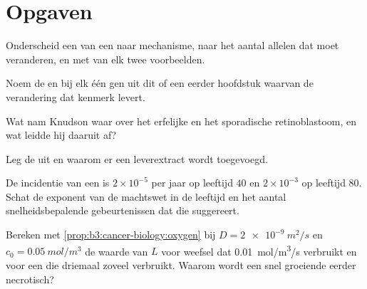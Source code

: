 \section{Opgaven}

\begin{exercise}[$\star$]\label{exo:b3:cancer-biology:1}
Onderscheid een  van een  naar mechanisme,
naar het aantal allelen dat moet veranderen, en met van elk twee
voorbeelden.
\end{exercise}

\begin{exercise}[$\star$]\label{exo:b3:cancer-biology:2}
Noem de  en bij elk één gen uit dit of een eerder
hoofdstuk waarvan de verandering dat kenmerk levert.
\end{exercise}

\begin{exercise}[$\star$]\label{exo:b3:cancer-biology:3}
Wat nam Knudson waar over het erfelijke en het sporadische
retinoblastoom, en wat leidde hij daaruit af?
\end{exercise}

\begin{exercise}[$\star$]\label{exo:b3:cancer-biology:4}
Leg de  uit en waarom er een leverextract wordt toegevoegd.
\end{exercise}

\begin{exercise}[$\star\star$]\label{exo:b3:cancer-biology:5}
De incidentie van een  is $2\times 10^{-5}$ per jaar op leeftijd
$40$ en $2\times 10^{-3}$ op leeftijd $80$. Schat de exponent van de
machtswet in de leeftijd en het aantal snelheidsbepalende
gebeurtenissen dat die suggereert.
\end{exercise}

\begin{exercise}[$\star\star$]\label{exo:b3:cancer-biology:6}
Bereken met \cref{prop:b3:cancer-biology:oxygen} bij $D =
\qty{2e-9}{m^2/s}$ en $c_{0} = \qty{0.05}{mol/m^3}$ de waarde van $L$
voor weefsel dat \qty{0.01}{mol/m^3/s} verbruikt en voor een  die
driemaal zoveel verbruikt. Waarom wordt een snel groeiende  eerder
necrotisch?
\end{exercise}

